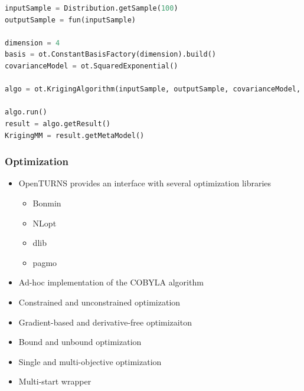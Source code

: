 \documentclass[aspectratio=169]{beamer}
\begin{document}
\begin{frame}[containsverbatim]
\begin{minipage}[t]{0.5\textwidth}
\tiny
\begin{lstlisting}[language=Python, numbers = none]
inputSample = Distribution.getSample(100)
outputSample = fun(inputSample)

dimension = 4
basis = ot.ConstantBasisFactory(dimension).build()
covarianceModel = ot.SquaredExponential()

algo = ot.KrigingAlgorithm(inputSample, outputSample, covarianceModel, basis)
  
algo.run()
result = algo.getResult()
KrigingMM = result.getMetaModel()
\end{lstlisting}

\end{minipage}

\end{frame}




\begin{frame}[containsverbatim]
\frametitle{Optimization}


\begin{itemize}
\item OpenTURNS provides an interface with several optimization libraries
\begin{itemize}
\item Bonmin
\item NLopt
\item dlib
\item pagmo
\end{itemize}

\item Ad-hoc implementation of the COBYLA algorithm

\vspace{6pt}


\item Constrained and unconstrained optimization
\item Gradient-based and derivative-free optimizaiton
\item Bound and unbound optimization
\item Single and multi-objective optimization
\item Multi-start wrapper


\end{itemize}


\end{frame}



\end{document}
